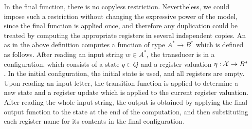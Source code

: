 In the final function, there is no copyless restriction. Nevertheless, we could impose such a restriction without changing the expressive power of the model, since the final function is applied once, and therefore any duplication could be treated by computing the appropriate registers in several independent copies.
An \sst as in the above definition computes a function of type $A^* \to B^*$ which is defined as follows. After reading an input string $w \in A^*$, the transducer is in a configuration, which consists of a state $q \in Q$ and a register valuation $\eta : \mathcal X \to B^*$. In the initial configuration, the initial state is used, and all registers are empty. Upon reading an input letter, the transition function is applied to determine a new state and a register update which is applied to the current register valuation. After reading the whole input string, the output is obtained by applying the final output function to the  state at the end of the computation, and then substituting each register name for its contents in the final configuration.



